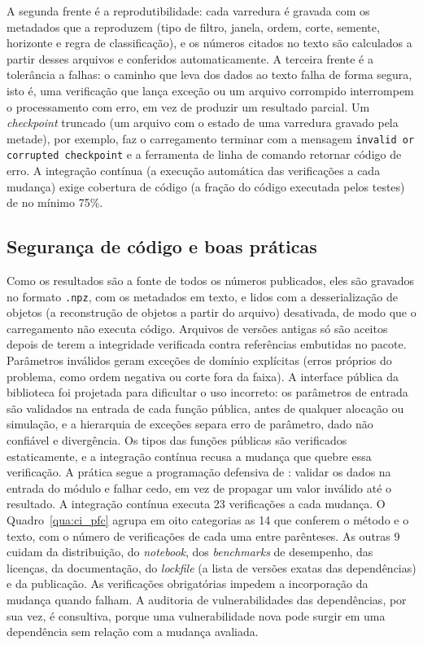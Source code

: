 \documentclass{pfccefsa}
\newcommand{\estr}[1]{\textit{#1}}
\begin{document}
A segunda frente é a reprodutibilidade: cada varredura é gravada com os metadados que a
reproduzem (tipo de filtro, janela, ordem, corte, semente, horizonte e regra de
classificação), e os números citados no texto são calculados a partir desses
arquivos e conferidos automaticamente. A terceira frente é a tolerância a falhas: o
caminho que leva dos dados ao texto falha de forma segura, isto é, uma
verificação que lança exceção ou um arquivo corrompido interrompem o
processamento com erro, em vez de produzir um resultado parcial. Um \estr{checkpoint}
truncado (um arquivo com o estado de uma varredura gravado pela metade), por
exemplo, faz o carregamento terminar com a mensagem
\texttt{invalid or corrupted checkpoint} e a ferramenta de linha de comando
retornar código de erro. A integração contínua (a execução automática das
verificações a cada mudança) exige cobertura de código (a fração do código
executada pelos testes) de no mínimo 75\%.

\subsection{Segurança de código e boas práticas}
\label{sub:seguranca}

Como os resultados são a fonte de todos os números publicados, eles
são gravados no formato \texttt{.npz}, com os metadados em texto, e lidos com a
desserialização de objetos (a reconstrução de objetos a partir do arquivo)
desativada, de modo que o carregamento não executa código. Arquivos de versões antigas só são aceitos depois de terem a integridade
verificada contra referências embutidas no pacote. Parâmetros inválidos geram exceções de domínio explícitas (erros próprios do
problema, como ordem negativa ou corte fora da faixa). A interface pública da biblioteca foi projetada para dificultar o uso incorreto: os parâmetros de entrada são validados na entrada de cada
função pública, antes de qualquer alocação ou simulação, e a hierarquia de
exceções separa erro de parâmetro, dado não confiável e divergência. Os tipos
das funções públicas são verificados estaticamente, e a integração contínua
recusa a mudança que quebre essa verificação. A prática segue a programação
defensiva de \textcite{McConnell2004}: validar os dados na entrada do
módulo e falhar cedo, em vez de propagar um valor inválido até o
resultado. A integração contínua executa 23 verificações a
cada mudança. O Quadro~\ref{qua:ci_pfc} agrupa em oito categorias as 14 que conferem o
método e o texto, com o número de verificações de cada uma entre parênteses. As
outras 9 cuidam da distribuição, do \estr{notebook}, dos \estr{benchmarks} de
desempenho, das licenças, da documentação, do \estr{lockfile} (a lista de versões
exatas das dependências) e da publicação. As verificações obrigatórias impedem a
incorporação da mudança quando falham. A auditoria de vulnerabilidades das
dependências, por sua vez, é consultiva, porque uma vulnerabilidade nova pode
surgir em uma dependência sem relação com a mudança avaliada.
\end{document}
